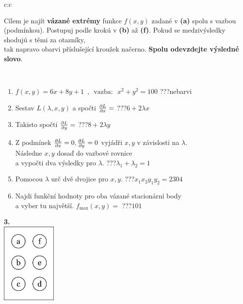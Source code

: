 \documentclass[10pt]{report}
\begin{document}
\begin{tabular}{c:c}
\begin{minipage}[c][104.5mm][t]{0.5\linewidth}
\begin{center}
\begin{minipage}{0.95\linewidth}
\begin{center}
Cílem je najít \textbf{vázané extrémy} funkce $f(x,y)$ zadané v \textbf{(a)} spolu s vazbou (podmínkou). Postupuj podle krokú v \textbf{(b)} až \textbf{(f)}. Pokud se medzivýsledky shodujú s těmi za otazníky,\\tak napravo obarvi příslušející kroužek načerno. \textbf{Spolu odevzdejte výsledné slovo}.
\end{center}
\end{minipage}
\\[1mm]
\begin{minipage}{0.79\linewidth}
\begin{center}
\begin{varwidth}{\linewidth}
\begin{enumerate}
\normalsize
\item $f(x,y)=6x+8y+1 \enspace , \enspace \mathrm{vazba:} \enspace x^2+y^2=100$\quad \dotfill\; ???\;\dotfill \quad nebarvi
\item Sestav $L(\lambda,x,y)$ a spočti $\pdv{L}{x}=$\quad \dotfill\; ???\;\dotfill \quad $6+2\lambda x$
\item Takisto spočti $\pdv{L}{y}=$\quad \dotfill\; ???\;\dotfill \quad $8+2\lambda y$
\item Z podmínek $\pdv{L}{x}=0 , \pdv{L}{y}=0$ vyjádři $x,y$ v závislosti na $\lambda$.\\ \phantom{xxxxxx}Následne $x,y$ dosaď do vazbové rovnice\\ \phantom{xxxxxx}a vypočti dva výsledky pro $\lambda$.\quad \dotfill\; ???\;\dotfill \quad $\lambda_1+\lambda_2=1$
\item Pomocou $\lambda$ urč dvě dvojice pro $x,y$.\quad \dotfill\; ???\;\dotfill \quad $x_1 x_2 y_1 y_2=2304$
\item Najdi funkční hodnoty pro oba vázané stacionární body\\ \phantom{xxxxxx}a vyber tu najvětší. $f_{\text{max}}(x,y)=$\quad \dotfill\; ???\;\dotfill \quad $101$
\end{enumerate}
\end{varwidth}
\end{center}
\end{minipage}
\begin{minipage}{0.20\linewidth}
\begin{center}
{\Huge\bfseries 3.} \\[2mm]
\includegraphics[height=40mm]{../images/braille.png}

\end{center}
\end{minipage}
\end{center}
\end{minipage}
\end{tabular}
\end{document}
